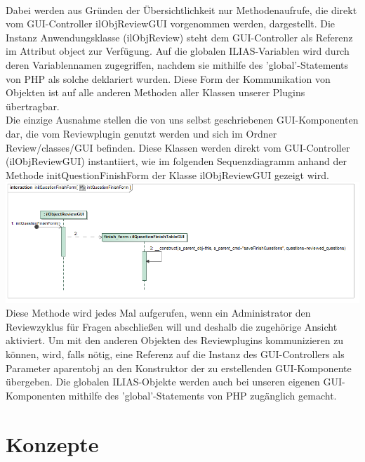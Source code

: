 \documentclass[a4paper]{scrreprt}
\begin{document}
\label{Fertige Fragen Speichern}\\ 
Dabei werden aus Gründen der Übersichtlichkeit nur Methodenaufrufe, die direkt vom GUI-Controller ilObjReviewGUI vorgenommen werden, dargestellt. Die Instanz Anwendungsklasse (ilObjReview) steht dem GUI-Controller als Referenz im Attribut object zur Verfügung. Auf die globalen ILIAS-Variablen wird durch deren Variablennamen zugegriffen, nachdem sie mithilfe des 'global'-Statements von PHP als solche deklariert wurden. Diese Form der Kommunikation von Objekten ist auf alle anderen Methoden aller Klassen unserer Plugins übertragbar.\\
Die einzige Ausnahme stellen die von uns selbst geschriebenen GUI-Komponenten dar, die vom Reviewplugin genutzt werden und sich im Ordner Review/classes/GUI befinden. Diese Klassen werden direkt vom GUI-Controller (ilObjReviewGUI) instantiiert, wie im folgenden Sequenzdiagramm anhand der Methode initQuestionFinishForm der Klasse ilObjReviewGUI gezeigt wird.\\
\includegraphics[width=1.0\textwidth]{Sequence_Diagram__initQuestionFinishForm__initQuestionFinishForm}
\label{Iniziiere Finale Fragenform}\\ 
Diese Methode wird jedes Mal aufgerufen, wenn ein Administrator den Reviewzyklus für Fragen abschließen will und deshalb die zugehörige Ansicht aktiviert. Um mit den anderen Objekten des Reviewplugins kommunizieren zu können, wird, falls nötig, eine Referenz auf die Instanz des GUI-Controllers als Parameter a\textunderscore parent\textunderscore obj an den Konstruktor der zu erstellenden GUI-Komponente übergeben. Die globalen ILIAS-Objekte werden auch bei unseren eigenen GUI-Komponenten mithilfe des 'global'-Statements von PHP zugänglich gemacht.
\chapter{Konzepte}
\end{document}
